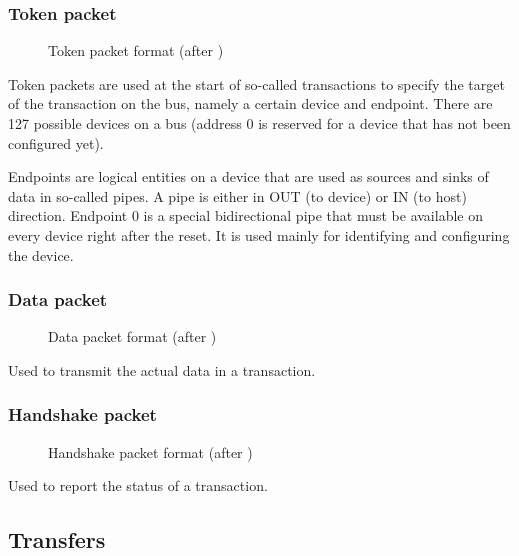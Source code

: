 \documentclass{article}
\begin{document}
\subsubsection{Token packet}

\begin{figure}[H]
  \caption{Token packet format (after \cite[p. 199]{usbstd})}
  \centering
  \scalebox{1}{}
\end{figure}

Token packets are used at the start of so-called transactions to specify the target
of the transaction on the bus, namely a certain device and endpoint. There are 127
possible devices on a bus (address 0 is reserved for a device that has not been configured yet).
\cite[p. 256]{usbstd}

Endpoints are logical entities on a device that are used as sources and sinks of data
in so-called pipes. A pipe is either in OUT (to device) or IN (to host) direction.
Endpoint 0 is a special bidirectional pipe that must be available on every device
right after the reset. It is used mainly for identifying and configuring the device.
\cite[p. 33]{usbstd}

\subsubsection{Data packet}

\begin{figure}[H]
  \caption{Data packet format (after \cite[p. 206]{usbstd})}
  \centering
  \scalebox{1}{}
\end{figure}

Used to transmit the actual data in a transaction.

\subsubsection{Handshake packet}

\begin{figure}[H]
  \caption{Handshake packet format (after \cite[p. 206]{usbstd})}
  \centering
  \scalebox{1}{}
\end{figure}

Used to report the status of a transaction.

\subsection{Transfers}
\end{document}

